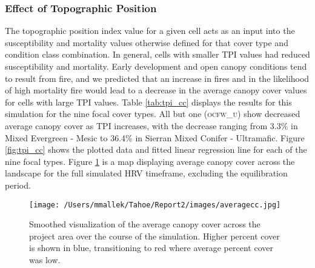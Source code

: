 \clearpage
\subsubsection{Effect of Topographic Position}

The topographic position index value for a given cell acts as an input into the susceptibility and mortality values otherwise defined for that cover type and condition class combination. In general, cells with smaller TPI values had reduced susceptibility and mortality. Early development and open canopy conditions tend to result from fire, and we predicted that an increase in fires and in the likelihood of high mortality fire would lead to a decrease in the average canopy cover values for cells with large TPI values. Table \ref{tab:tpi_cc} displays the results for this simulation for the nine focal cover types. All but one (\textsc{ocfw\_u}) show decreased average canopy cover as TPI increases, with the decrease ranging from 3.3\% in Mixed Evergreen - Mesic to 36.4\% in Sierran Mixed Conifer - Ultramafic. Figure \ref{fig:tpi_cc} shows the plotted data and fitted linear regression line for each of the nine focal types. Figure \ref{fig:averagecc}  is a map displaying average canopy cover across the landscape for the full simulated HRV timeframe, excluding the equilibration period. 

\begin{figure}[!htbp]
\centering
\texttt{[image: /Users/mmallek/Tahoe/Report2/images/averagecc.jpg]}
\caption{Smoothed visualization of the average canopy cover across the project area over the course of the simulation. Higher percent cover is shown in blue, transitioning to red where average percent cover was low.}
\label{fig:averagecc}
\end{figure}


